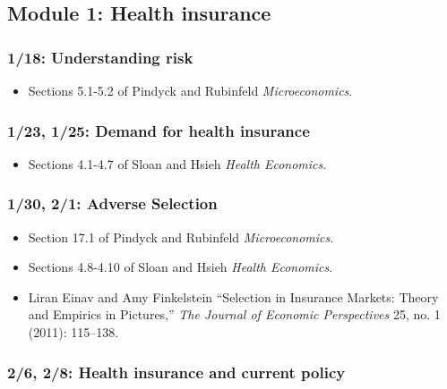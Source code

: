 \documentclass[11pt,]{article}
\providecommand{\tightlist}{%
  \setlength{\itemsep}{0pt}\setlength{\parskip}{0pt}}
\begin{document}
\hypertarget{module-1-health-insurance}{%
\subsection{Module 1: Health
insurance}\label{module-1-health-insurance}}

\hypertarget{understanding-risk}{%
\subsubsection{1/18: Understanding risk}\label{understanding-risk}}

\begin{itemize}
\tightlist
\item
  Sections 5.1-5.2 of Pindyck and Rubinfeld \emph{Microeconomics}.
\end{itemize}

\hypertarget{demand-for-health-insurance}{%
\subsubsection{1/23, 1/25: Demand for health
insurance}\label{demand-for-health-insurance}}

\begin{itemize}
\tightlist
\item
  Sections 4.1-4.7 of Sloan and Hsieh \emph{Health Economics}.
\end{itemize}

\hypertarget{adverse-selection}{%
\subsubsection{1/30, 2/1: Adverse Selection}\label{adverse-selection}}

\begin{itemize}
\tightlist
\item
  Section 17.1 of Pindyck and Rubinfeld \emph{Microeconomics}.
\item
  Sections 4.8-4.10 of Sloan and Hsieh \emph{Health Economics}.
\item
  Liran Einav and Amy Finkelstein {``Selection in {Insurance} {Markets}:
  {Theory} and {Empirics} in {Pictures},''} \emph{The Journal of
  Economic Perspectives} 25, no. 1 (2011): 115--138.
\end{itemize}

\hypertarget{health-insurance-and-current-policy}{%
\subsubsection{2/6, 2/8: Health insurance and current
policy}\label{health-insurance-and-current-policy}}
\end{document}
